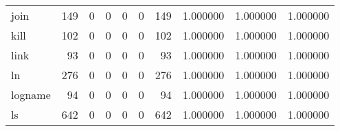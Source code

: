 \begin{longtable}{lrrrrrrrrr}
join      &                                                149 &                                                  0 &                                                  0 &                                                  0 &                                                  0 &                                                149 &                                           1.000000 &                               1.000000 &                             1.000000 \\
kill      &                                                102 &                                                  0 &                                                  0 &                                                  0 &                                                  0 &                                                102 &                                           1.000000 &                               1.000000 &                             1.000000 \\
link      &                                                 93 &                                                  0 &                                                  0 &                                                  0 &                                                  0 &                                                 93 &                                           1.000000 &                               1.000000 &                             1.000000 \\
ln        &                                                276 &                                                  0 &                                                  0 &                                                  0 &                                                  0 &                                                276 &                                           1.000000 &                               1.000000 &                             1.000000 \\
logname   &                                                 94 &                                                  0 &                                                  0 &                                                  0 &                                                  0 &                                                 94 &                                           1.000000 &                               1.000000 &                             1.000000 \\
ls        &                                                642 &                                                  0 &                                                  0 &                                                  0 &                                                  0 &                                                642 &                                           1.000000 &                               1.000000 &                             1.000000 \\

\end{longtable}
